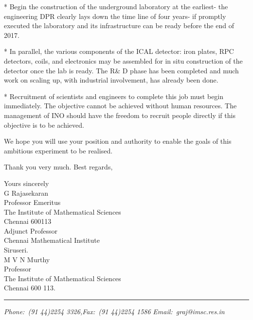 \documentclass[12pt]{article}
\begin{document}
* Begin the construction of the underground laboratory at the earliest-
the engineering DPR clearly lays down the time line of four years- if
promptly executed the laboratory and its infrastructure can be ready
before the end of 2017.

* In parallel, the various components of the ICAL detector: iron plates,
RPC detectors, coils, and electronics may be assembled for in situ
construction of the detector once the lab is ready. The R\& D phase has
been completed and much work on scaling up, with industrial involvement,
has already been done.

* Recruitment of scientists and engineers to complete this job must begin
immediately. The objective cannot be achieved without human resources.
The management of INO should have the freedom to recruit people directly
if this objective is to be achieved.

We hope you will use your position and authority to enable the goals of
this ambitious experiment to be realised.

Thank you very much. Best regards,

\begin{flushleft}

Yours sincerely\\[1.5cm]

G Rajasekaran\\
Professor Emeritus\\
The Institute of Mathematical Sciences\\
Chennai 600113\\
Adjunct Professor\\
Chennai Mathematical Institute\\
Siruseri.\\
\vskip 1cm 
M V N Murthy\\
Professor\\
The Institute of Mathematical Sciences\\
Chennai 600 113.\\
\end{flushleft}




\vfill

\hrule
\begin{flushleft}
{\sl Phone:~(91 44)2254 3326,\hfill Fax:~(91 44)2254 
1586}\hfill
{\sl Email:~graj@imsc.res.in} 
\end{flushleft}
\end{document}
